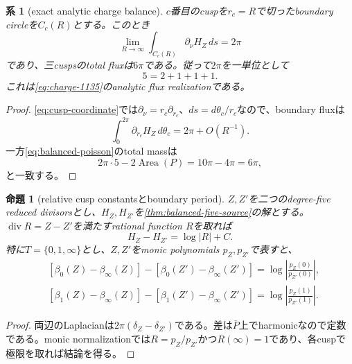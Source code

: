 \documentclass[11pt,a4paper]{ltjsarticle}
\newtheorem{proposition}[theorem]{命題}
\newtheorem{corollary}[theorem]{系}
\theoremstyle{definition}
\theoremstyle{remark}
\begin{document}
\begin{corollary}[exact analytic charge balance]\label{cor:analytic-charge}
$c$番目のcuspを$r_c=R$で切ったboundary circleを$C_c(R)$とする。このとき
\begin{equation}\label{eq:unit-cusp-flux}
 \lim_{R\to\infty}\int_{C_c(R)}\partial_\nu H_Z\,ds=2\pi
\end{equation}
であり、三cuspsのtotal fluxは$6\pi$である。従って$2\pi$を一単位として
\begin{equation}\label{eq:analytic-5-2-3}
 \boxed{5=2+1+1+1.}
\end{equation}
これは\eqref{eq:charge-1135}のanalytic flux realizationである。
\end{corollary}

\begin{proof}
\eqref{eq:cusp-coordinate}では$\partial_\nu=r_c\partial_{r_c}$、$ds=d\theta_c/r_c$なので、boundary fluxは
\[
 \int_0^{2\pi}\partial_{r_c}H_Z\,d\theta_c
 =2\pi+O(R^{-1}).
\]
一方\eqref{eq:balanced-poisson}のtotal massは
\[
 2\pi\cdot5-2\operatorname{Area}(P)=10\pi-4\pi=6\pi,
\]
と一致する。
\end{proof}

\begin{proposition}[relative cusp constantsとboundary period]\label{prop:cusp-period}
$Z,Z'$を二つのdegree-five reduced divisorsとし、$H_Z,H_{Z'}$を\cref{thm:balanced-five-source}の解とする。$\operatorname{div}R=Z-Z'$を満たすrational function $R$を取れば
\begin{equation}\label{eq:potential-difference-rational}
 H_Z-H_{Z'}=\log|R|+C.
\end{equation}
特に$T=\{0,1,\infty\}$とし、$Z,Z'$をmonic polynomials $p_Z,p_{Z'}$で表すと、
\begin{align}
 &[\beta_0(Z)-\beta_\infty(Z)]
 -[\beta_0(Z')-\beta_\infty(Z')]
 =\log\left|\frac{p_Z(0)}{p_{Z'}(0)}\right|,
 \label{eq:beta0-period}\\
 &[\beta_1(Z)-\beta_\infty(Z)]
 -[\beta_1(Z')-\beta_\infty(Z')]
 =\log\left|\frac{p_Z(1)}{p_{Z'}(1)}\right|.
 \label{eq:beta1-period}
\end{align}
\end{proposition}

\begin{proof}
両辺のLaplacianは$2\pi(\delta_Z-\delta_{Z'})$である。差は$\overline P$上でharmonicなので定数である。monic normalizationでは$R=p_Z/p_{Z'}$かつ$R(\infty)=1$であり、各cuspで極限を取れば結論を得る。
\end{proof}
\end{document}
